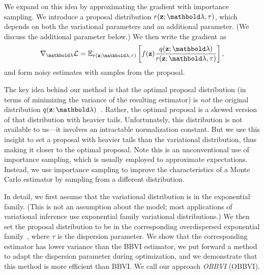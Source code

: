 \documentclass[]{article}
\begin{document}
We expand on this idea by approximating the gradient with importance
sampling.  We introduce a proposal distribution
$r(\bz; \blambda, \tau)$, which depends on both the variational
parameters and an additional parameter. (We discuss the additional
parameter below.) We then write the gradient as
\begin{align}
  \label{eq:isgrad}
  \nabla_{\blambda} \cL = \E{r(\bz; \blambda, \tau)}{f(\bz) \frac{q(\bz;
  \blambda)}{r(\bz; \blambda, \tau)}},
\end{align}
and form noisy estimates with samples from the proposal.

The key idea behind our method is that the optimal proposal
distribution (in terms of minimizing the variance of the resulting
estimator) is \textit{not} the original distribution
$q(\bz; \blambda)$~\citep[Chapter~9]{Owen2013}.  Rather, the optimal
proposal is a skewed version of that distribution with heavier tails.
Unfortunately, this distribution is not available to us---it involves
an intractable normalization constant.
But we use this insight to set a proposal with heavier tails than
the variational distribution, thus making it closer to the optimal
proposal. Note this is an unconventional use of importance
sampling, which is usually employed to approximate expectations.
Instead, we use importance sampling to
improve the characteristics of a Monte Carlo estimator by sampling
from a different distribution.

In detail, we first assume that the variational distribution is in the
exponential family.  (This is not an assumption about the model; most
applications of variational inference use exponential family
variational distributions.)  We then set the proposal distribution to
be in the corresponding overdispersed exponential
family~\citep{Jorgensen1987}, where $\tau$ is the dispersion
parameter. We show that the corresponding estimator has lower
variance than the \gls{BBVI} estimator, we put forward a method to adapt
the dispersion parameter during optimization, and we demonstrate that this
method is more efficient than \gls{BBVI}. We call our approach
\emph{\acrlong{OBBVI}} (\acrshort{OBBVI}).


\end{document}
